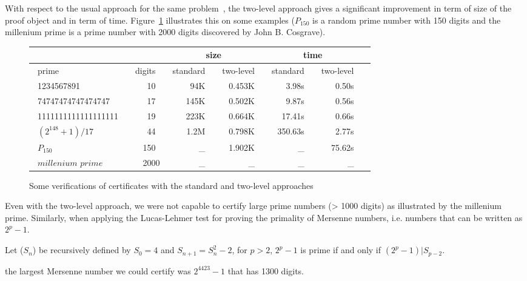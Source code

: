 With respect to the usual approach for the same 
problem~\cite{Caprotti_Oostdijk:01pockjsc}, the two-level
approach gives a significant improvement in term of size of the
proof object and in term of time.  
Figure~\ref{fig:TimeComp} illustrates this on some examples 
($P_{150}$ is a random prime number with 150 digits and the millenium prime is
a prime number with 2000 digits discovered by John B. Cosgrave).
\begin{figure}
\begin{center}
\begin{tabular}{|l|r|r|r|r|r|r|}
\cline{3-6}
\multicolumn{2}{c}{} & \multicolumn{2}{|c|}{size} &
                                               \multicolumn{2}{c|}{time} \\
\hline
~prime     ~     & \multicolumn{1}{c|}{~digits~ } & ~standard~  &
  \multicolumn{1}{c|}{ ~two-level~ } &
  \multicolumn{1}{c|}{ ~standard~ } &
  \multicolumn{1}{c|}{ ~two-level~ } \\
\hline
~1234567891       ~   & 10~ &  94K~ &  ~0.453K~ & 3.98s~  & 0.50s~  \\
~74747474747474747~   & 17~ & 145K~ &  0.502K~ &   9.87s~ & 0.56s~ \\
~1111111111111111111~ & 19~ & 223K~ &  0.664K~ & 17.41s~  & 0.66s~   \\
~$(2^{148}+1)/17$ ~   & 44~ & 1.2M~ & 0.798K~ & ~350.63s~  & 2.77s~   \\
~$P_{150}$   ~        &150~ &  \_~  & 1.902K~   &  \_~   & 75.62s~  \\
~$\textit{millenium prime}$~   &2000 & \_~   & \_~      & \_~    & \_~ \\
\hline
\end{tabular}
\end{center}
\caption{Some verifications of certificates with the standard and two-level approaches}
\label{fig:TimeComp}
\end{figure} 
Even with the two-level approach, we were not capable to certify large prime numbers 
(> 1000 digits) as illustrated by the millenium prime.
Similarly, when applying the Lucas-Lehmer test
for proving the primality of Mersenne numbers, 
i.e. numbers that can be written as $2 ^ p -1$.
\begin{theorem}\label{lucas}
Let ($S_n$) be recursively defined by $S_0= 4$ and $S_{n+1} = S_n^2 - 2$,
for $p > 2$, $2^p-1$ is prime if and only if $(2^p -1) | S_{p-2}$.
\end{theorem}
the largest Mersenne number we could certify was $2^{4423} - 1$ that has 1300 digits. 

